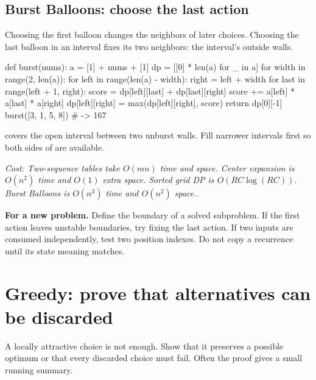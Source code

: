 \documentclass[11pt]{article}
\newcommand{\cd}[1]{{\frenchspacing\texttt{\detokenize{#1}}}}
\newcommand{\transfer}[1]{\par\textbf{For a new problem.} #1\par}
\newcommand{\cost}[1]{\par\textit{Cost: #1.}\par}
\begin{document}
\subsection{Burst Balloons: choose the last action}
Choosing the first balloon changes the neighbors of later choices.
Choosing the last balloon in an interval fixes its two neighbors: the interval's outside walls.
\par\noindent\begin{minipage}{\linewidth}
\hypertarget{example-start-60}{}
\begin{pyex}
def burst(nums):
    a = [1] + nums + [1]
    dp = [[0] * len(a) for _ in a]
    for width in range(2, len(a)):
        for left in range(len(a) - width):
            right = left + width
            for last in range(left + 1, right):
                score = dp[left][last] + dp[last][right]
                score += a[left] * a[last] * a[right]
                dp[left][right] = max(dp[left][right], score)
    return dp[0][-1]
burst([3, 1, 5, 8])                  # -> 167
\end{pyex}
\hypertarget{example-end-60}{}
\end{minipage}\par
\cd{dp[left][right]} covers the open interval between two unburst walls.
Fill narrower intervals first so both sides of \cd{last} are available.
\cost{Two-sequence tables take \(O(mn)\) time and space. Center expansion is \(O(n^2)\) time and \(O(1)\) extra space.
Sorted grid DP is \(O(RC\log(RC))\). Burst Balloons is \(O(n^3)\) time and \(O(n^2)\) space.}
\transfer{Define the boundary of a solved subproblem. If the first action leaves unstable boundaries, try fixing the last action.
If two inputs are consumed independently, test two position indexes. Do not copy a recurrence until its state meaning matches.}

\section{Greedy: prove that alternatives can be discarded}\label{sec:greedy}
A locally attractive choice is not enough. Show that it preserves a possible optimum or that every discarded choice must fail.
Often the proof gives a small running summary.
\end{document}
